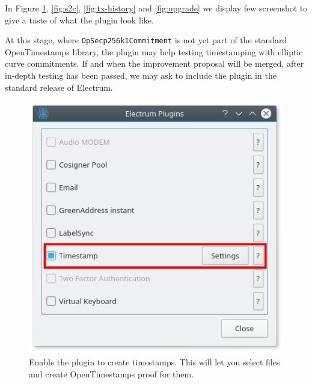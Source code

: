 In Figure \ref{fig:enable-plugin}, \ref{fig:s2c}, \ref{fig:tx-history} and \ref{fig:upgrade} we display few screenshot to give a taste of what the plugin look like.

At this stage, where \verb|OpSecp256k1Commitment| is not yet part of the standard OpenTimestamps library, the plugin may help testing timestamping with elliptic curve commitments. 
If and when the improvement proposal will be merged, after in-depth testing has been passed, we may ask to include the plugin in the standard release of Electrum.

\begin{figure}
	\begin{center}
		\includegraphics[width=0.5\linewidth]{Images/enable-plugin.png}
		\caption[Enable the plugin to create timestamps]{Enable the plugin to create timestamps. This will let you select files and create OpenTimestamps proof for them.}
		\label{fig:enable-plugin}
	\end{center}
\end{figure} 

